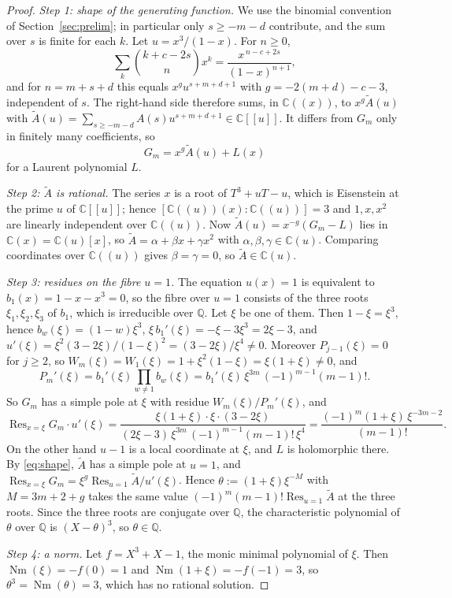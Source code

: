 \documentclass[11pt]{amsart}
\theoremstyle{definition}
\newcommand{\C}{\mathbb{C}}
\newcommand{\Q}{\mathbb{Q}}
\DeclareMathOperator{\Res}{Res}
\DeclareMathOperator{\Nm}{Nm}
\begin{document}
\begin{proof}
\emph{Step 1: shape of the generating function.} We use the binomial convention of Section~\ref{sec:prelim}; in particular only $s\ge-m-d$ contribute, and the sum over $s$ is finite for each $k$. Let $u=x^3/(1-x)$. For $n\ge0$,
\[
  \sum_{k}\binom{k+c-2s}{n}x^k=\frac{x^{\,n-c+2s}}{(1-x)^{n+1}},
\]
and for $n=m+s+d$ this equals $x^{g}u^{s+m+d+1}$ with $g=-2(m+d)-c-3$, independent of $s$. The right-hand side therefore sums, in $\C((x))$, to $x^g\tilde A(u)$ with $\tilde A(u)=\sum_{s\ge-m-d}A(s)u^{s+m+d+1}\in\C[[u]]$. It differs from $G_m$ only in finitely many coefficients, so
\begin{equation}\label{eq:shape}
  G_m=x^g\tilde A(u)+L(x)
\end{equation}
for a Laurent polynomial $L$.

\emph{Step 2: $\tilde A$ is rational.} The series $x$ is a root of $T^3+uT-u$, which is Eisenstein at the prime $u$ of $\C[[u]]$; hence $[\C((u))(x):\C((u))]=3$ and $1,x,x^2$ are linearly independent over $\C((u))$. Now $\tilde A(u)=x^{-g}(G_m-L)$ lies in $\C(x)=\C(u)[x]$, so $\tilde A=\alpha+\beta x+\gamma x^2$ with $\alpha,\beta,\gamma\in\C(u)$. Comparing coordinates over $\C((u))$ gives $\beta=\gamma=0$, so $\tilde A\in\C(u)$.

\emph{Step 3: residues on the fibre $u=1$.} The equation $u(x)=1$ is equivalent to $b_1(x)=1-x-x^3=0$, so the fibre over $u=1$ consists of the three roots $\xi_1,\xi_2,\xi_3$ of $b_1$, which is irreducible over $\Q$. Let $\xi$ be one of them. Then $1-\xi=\xi^3$, hence $b_w(\xi)=(1-w)\xi^3$, $\xi\,b_1'(\xi)=-\xi-3\xi^3=2\xi-3$, and $u'(\xi)=\xi^2(3-2\xi)/(1-\xi)^2=(3-2\xi)/\xi^4\ne0$. Moreover $P_{j-1}(\xi)=0$ for $j\ge2$, so $W_m(\xi)=W_1(\xi)=1+\xi^2(1-\xi)=\xi(1+\xi)\ne0$, and
\[
  P_m'(\xi)=b_1'(\xi)\prod_{w\ne1}b_w(\xi)=b_1'(\xi)\,\xi^{3m}\,(-1)^{m-1}(m-1)!.
\]
So $G_m$ has a simple pole at $\xi$ with residue $W_m(\xi)/P_m'(\xi)$, and
\[
  \Res_{x=\xi}G_m\cdot u'(\xi)=\frac{\xi(1+\xi)\cdot\xi\cdot(3-2\xi)}{(2\xi-3)\,\xi^{3m}\,(-1)^{m-1}(m-1)!\,\xi^4}=\frac{(-1)^m(1+\xi)\,\xi^{-3m-2}}{(m-1)!}.
\]
On the other hand $u-1$ is a local coordinate at $\xi$, and $L$ is holomorphic there. By \eqref{eq:shape}, $\tilde A$ has a simple pole at $u=1$, and $\Res_{x=\xi}G_m=\xi^g\Res_{u=1}\tilde A/u'(\xi)$. Hence $\theta:=(1+\xi)\xi^{-M}$ with $M=3m+2+g$ takes the same value $(-1)^m(m-1)!\Res_{u=1}\tilde A$ at the three roots. Since the three roots are conjugate over $\Q$, the characteristic polynomial of $\theta$ over $\Q$ is $(X-\theta)^3$, so $\theta\in\Q$.

\emph{Step 4: a norm.} Let $f=X^3+X-1$, the monic minimal polynomial of $\xi$. Then $\Nm(\xi)=-f(0)=1$ and $\Nm(1+\xi)=-f(-1)=3$, so $\theta^3=\Nm(\theta)=3$, which has no rational solution.
\end{proof}
\end{document}
